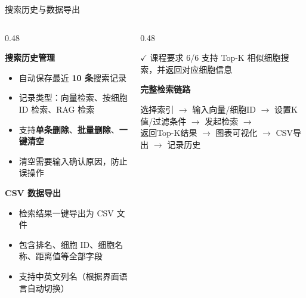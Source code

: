 \documentclass[aspectratio=169]{beamer}
\begin{document}
\begin{frame}{搜索历史与数据导出}

\begin{columns}[T]
  \begin{column}{0.48\textwidth}
    \fontsize{8}{10}\selectfont
    \vspace{0.5em}

    \textbf{搜索历史管理}
    \begin{itemize}
      \item 自动保存最近 \textbf{10 条}搜索记录
      \item 记录类型：向量检索、按细胞 ID 检索、RAG 检索
      \item 支持\textbf{单条删除}、\textbf{批量删除}、\textbf{一键清空}
      \item 清空需要输入确认原因，防止误操作
    \end{itemize}

    \vspace{0.5em}
    \textbf{CSV 数据导出}
    \begin{itemize}
      \item 检索结果一键导出为 CSV 文件
      \item 包含排名、细胞 ID、细胞名称、距离值等全部字段
      \item 支持中英文列名（根据界面语言自动切换）
    \end{itemize}
  \end{column}

  \begin{column}{0.48\textwidth}
    \centering
    \begin{alertblock}{$\checkmark$ 课程要求 6/6}
      支持 Top-K 相似细胞搜索，并返回对应细胞信息
    \end{alertblock}

    \vspace{1em}
    \textbf{完整检索链路}
    \begin{center}
      \footnotesize
      选择索引 $\to$ 输入向量/细胞ID $\to$ 设置K值/过滤条件 $\to$ 发起检索 $\to$\\
      返回Top-K结果 $\to$ 图表可视化 $\to$ CSV导出 $\to$ 记录历史
    \end{center}
  \end{column}
\end{columns}

\end{frame}
\end{document}
